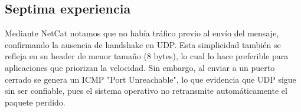 \subsection{Septima experiencia}
Mediante NetCat notamos que no había tráfico previo al envío del mensaje, confirmando la ausencia de handshake en UDP. Esta simplicidad también se refleja en su header de menor tamaño (8 bytes), lo cual lo hace preferible para aplicaciones que priorizan la velocidad. Sin embargo, al enviar a un puerto cerrado se genera un ICMP "Port Unreachable", lo que evidencia que UDP sigue sin ser confiable, pues el sistema operativo no retransmite automáticamente el paquete perdido.


%